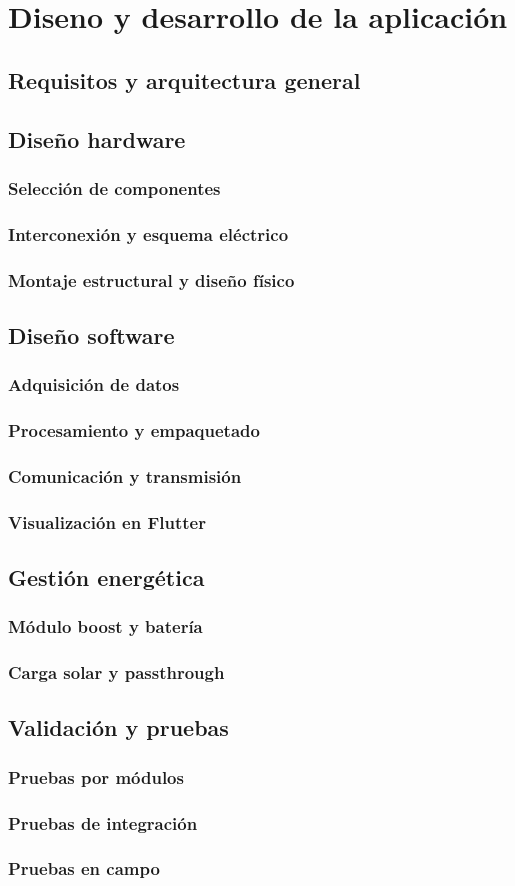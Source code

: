 \chapter{Diseno y desarrollo de la aplicaci\'on}

\section{Requisitos y arquitectura general}
\section{Diseño hardware}
\subsection{Selección de componentes}
\subsection{Interconexión y esquema eléctrico}
\subsection{Montaje estructural y diseño físico}
\section{Diseño software}
\subsection{Adquisición de datos}
\subsection{Procesamiento y empaquetado}
\subsection{Comunicación y transmisión}
\subsection{Visualización en Flutter}
\section{Gestión energética}
\subsection{Módulo boost y batería}
\subsection{Carga solar y passthrough}
\section{Validación y pruebas}
\subsection{Pruebas por módulos}
\subsection{Pruebas de integración}
\subsection{Pruebas en campo}

